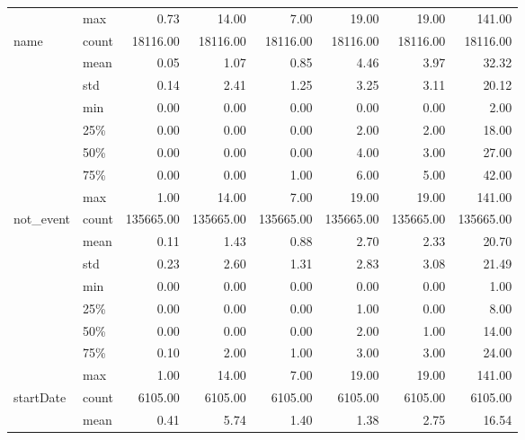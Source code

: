 \begin{table}[h]
\begin{center}
\begin{tabular}{llrrrrrr}
            & max &         0.73 &      14.00 &       7.00 &      19.00 &      19.00 &     141.00 \\
name & count &     18116.00 &   18116.00 &   18116.00 &   18116.00 &   18116.00 &   18116.00 \\
            & mean &         0.05 &       1.07 &       0.85 &       4.46 &       3.97 &      32.32 \\
            & std &         0.14 &       2.41 &       1.25 &       3.25 &       3.11 &      20.12 \\
            & min &         0.00 &       0.00 &       0.00 &       0.00 &       0.00 &       2.00 \\
            & 25\% &         0.00 &       0.00 &       0.00 &       2.00 &       2.00 &      18.00 \\
            & 50\% &         0.00 &       0.00 &       0.00 &       4.00 &       3.00 &      27.00 \\
            & 75\% &         0.00 &       0.00 &       1.00 &       6.00 &       5.00 &      42.00 \\
            & max &         1.00 &      14.00 &       7.00 &      19.00 &      19.00 &     141.00 \\
not\_event & count &    135665.00 &  135665.00 &  135665.00 &  135665.00 &  135665.00 &  135665.00 \\
            & mean &         0.11 &       1.43 &       0.88 &       2.70 &       2.33 &      20.70 \\
            & std &         0.23 &       2.60 &       1.31 &       2.83 &       3.08 &      21.49 \\
            & min &         0.00 &       0.00 &       0.00 &       0.00 &       0.00 &       1.00 \\
            & 25\% &         0.00 &       0.00 &       0.00 &       1.00 &       0.00 &       8.00 \\
            & 50\% &         0.00 &       0.00 &       0.00 &       2.00 &       1.00 &      14.00 \\
            & 75\% &         0.10 &       2.00 &       1.00 &       3.00 &       3.00 &      24.00 \\
            & max &         1.00 &      14.00 &       7.00 &      19.00 &      19.00 &     141.00 \\
startDate & count &      6105.00 &    6105.00 &    6105.00 &    6105.00 &    6105.00 &    6105.00 \\
            & mean &         0.41 &       5.74 &       1.40 &       1.38 &       2.75 &      16.54 \\

\end{tabular}
\end{center}
\end{table}

